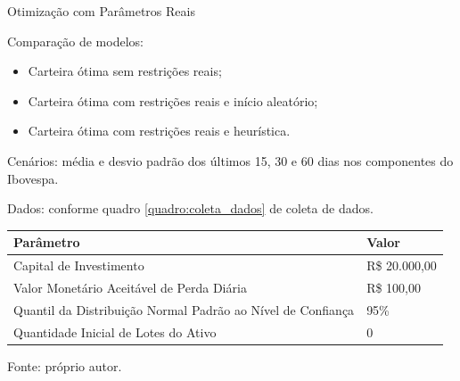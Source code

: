     \begin{frame}{Otimização com Parâmetros Reais}

        Comparação de modelos:

        \begin{itemize}
            \item Carteira ótima sem restrições reais;
            \item Carteira ótima com restrições reais e início aleatório;
            \item Carteira ótima com restrições reais e heurística.
        \end{itemize}
        
        Cenários: média e desvio padrão dos últimos 15, 30 e 60 dias nos componentes do Ibovespa. 

        Dados: conforme quadro \ref{quadro:coleta_dados} de coleta de dados.

        \begin{quadro}[H]
            \centering
            \caption{Parâmetros de mercado e investimento}
            \label{quadro:parametros}
            \begin{tabular}{ll}
                \hline
                \textbf{Parâmetro} & \textbf{Valor} \\
                \hline
                Capital de Investimento & R\$ 20.000,00 \\
                Valor Monetário Aceitável de Perda Diária & R\$ 100,00 \\
                Quantil da Distribuição Normal Padrão ao Nível de Confiança & 95\% \\
                Quantidade Inicial de Lotes do Ativo & 0 \\
                \hline
            \end{tabular}
            \par \footnotesize Fonte: próprio autor.
        \end{quadro}
        
    \end{frame}





